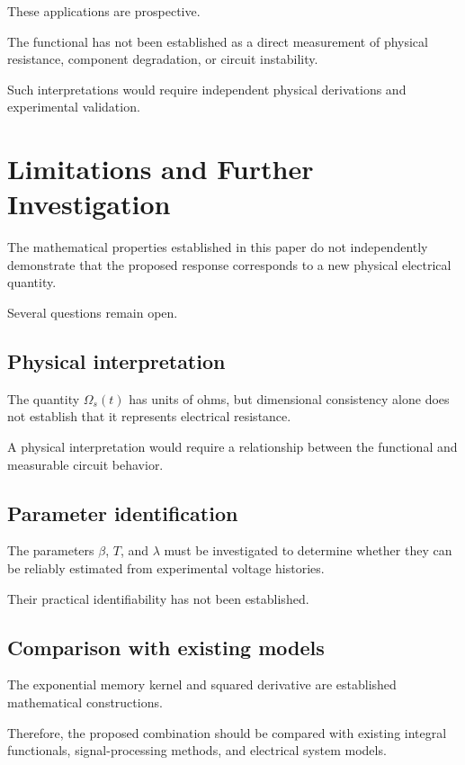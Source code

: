 \documentclass[12pt]{article}
\theoremstyle{definition}
\theoremstyle{remark}
\begin{document}
These applications are prospective.

The functional has not been established
as a direct measurement of physical resistance,
component degradation, or circuit instability.

Such interpretations would require independent
physical derivations and experimental validation.

\section{Limitations and Further Investigation}

The mathematical properties established in
this paper do not independently demonstrate
that the proposed response corresponds to
a new physical electrical quantity.

Several questions remain open.

\subsection{Physical interpretation}

The quantity \(\Omega_s(t)\) has units of ohms,
but dimensional consistency alone does not
establish that it represents electrical resistance.

A physical interpretation would require
a relationship between the functional and
measurable circuit behavior.

\subsection{Parameter identification}

The parameters \(\beta\), \(T\), and \(\lambda\)
must be investigated to determine whether
they can be reliably estimated from experimental
voltage histories.

Their practical identifiability has not
been established.

\subsection{Comparison with existing models}

The exponential memory kernel and squared
derivative are established mathematical
constructions.

Therefore, the proposed combination should
be compared with existing integral functionals,
signal-processing methods, and electrical
system models.
\end{document}
